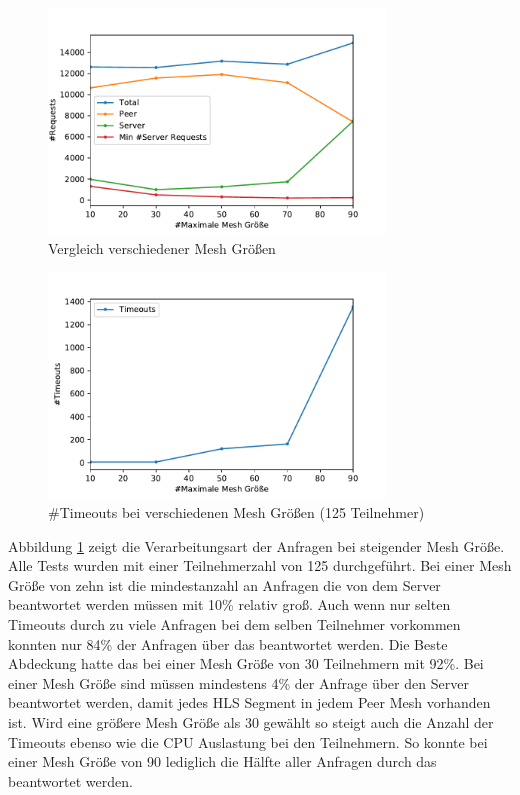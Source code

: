 \begin{figure}[!h]
	\centering
	\includegraphics[width=0.8\textwidth]{figures/mesh_comparison}
	\caption[A Figure Short-Title]{Vergleich verschiedener Mesh Größen}
	\label{fig:mesh_comparison}
\end{figure}

\begin{figure}[!h]
	\centering
	\includegraphics[width=0.8\textwidth]{figures/timeouts_meshed}
	\caption[A Figure Short-Title]{#Timeouts bei verschiedenen Mesh Größen (125 Teilnehmer)}
	\label{fig:timeouts_meshed}
\end{figure}

Abbildung \ref{fig:mesh_comparison} zeigt die Verarbeitungsart der Anfragen bei steigender Mesh Größe. Alle Tests wurden mit einer Teilnehmerzahl von 125 durchgeführt. Bei einer Mesh Größe von zehn ist die mindestanzahl an Anfragen die von dem Server beantwortet werden müssen mit 10\% relativ groß. Auch wenn nur selten Timeouts durch zu viele Anfragen bei dem selben Teilnehmer vorkommen konnten nur 84\% der Anfragen über das \pTp \cdn beantwortet werden. Die Beste Abdeckung hatte das \cdn bei einer Mesh Größe von 30 Teilnehmern mit 92\%. Bei einer Mesh Größe sind müssen mindestens 4\% der Anfrage über den Server beantwortet werden, damit jedes HLS Segment in jedem Peer Mesh vorhanden ist. Wird eine größere Mesh Größe als 30 gewählt so steigt auch die Anzahl der Timeouts ebenso wie die CPU Auslastung bei den Teilnehmern. So konnte bei einer Mesh Größe von 90 lediglich die Hälfte aller Anfragen durch das \pTp \cdn beantwortet werden.



